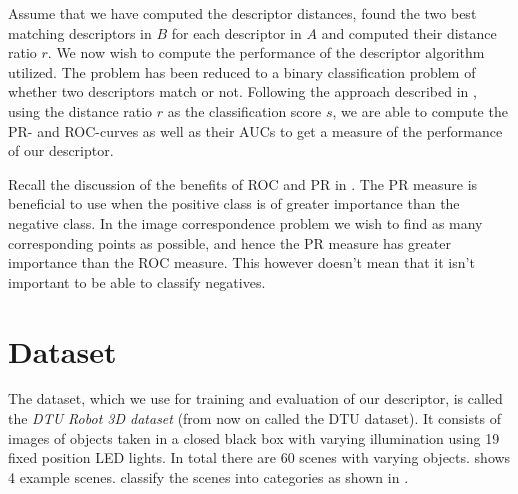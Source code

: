 \documentclass[thesis.tex]{subfiles}
\begin{document}
Assume that we have computed the descriptor distances, found the two best matching descriptors in $B$ for each descriptor in $A$ and computed their distance ratio $r$. We now wish to compute the performance of the descriptor algorithm utilized. The problem has been reduced to a binary classification problem of whether two descriptors match or not. Following the approach described in , using the distance ratio $r$ as the classification score $s$, we are able to compute the PR- and ROC-curves as well as their AUCs to get a measure of the performance of our descriptor.

Recall the discussion of the benefits of ROC and PR in . The PR measure is beneficial to use when the positive class is of greater importance than the negative class. In the image correspondence problem we wish to find as many corresponding points as possible, and hence the PR measure has greater importance than the ROC measure. This however doesn't mean that it isn't important to be able to classify negatives. 


\section{Dataset}
\label{sec:dtuDataset}
The dataset, which we use for training and evaluation of our descriptor, is called the \emph{DTU Robot 3D dataset} \cite{aanaes2010recall} (from now on called the DTU dataset). It consists of images of objects taken in a closed black box with varying illumination using 19 fixed position LED lights. In total there are 60 scenes with varying objects.  shows 4 example scenes. \citet{aanaes2010ground} classify the scenes into categories as shown in .
\end{document}
